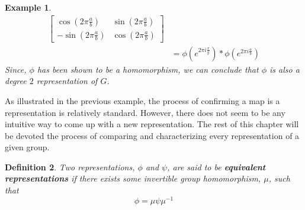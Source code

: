 \documentclass[10pt]{ucthesis}
\newtheorem{definition}{Definition}[chapter]
\newtheorem{example}[definition]{Example}
\begin{document}
\begin{example}
\begin{equation}
\begin{aligned}
											  		  \begin{bmatrix}
														\cos(2\pi\frac{a}{b}) & \sin(2\pi\frac{a}{b}) \\
														-\sin(2\pi\frac{a}{b}) & \cos(2\pi\frac{a}{b})
													  \end{bmatrix} \\
		                                                                                    &= \phi(e^{2\pi i\frac{x}{y}})*\phi(e^{2\pi i\frac{a}{b}})
		\end{aligned}
	\end{equation}
	Since, $\phi$ has been shown to be a homomorphism, we can conclude that $\phi$ is also a degree $2$ representation of $G$.
\end{example}

As illustrated in the previous example, the process of confirming a map is a representation is relatively standard. However, there does not seem to be any intuitive way to come up with a new representation. The rest of this chapter will be devoted the process of comparing and characterizing every representation of a given group.


\begin{definition}
	Two representations, $\phi$ and $\psi$, are said to be \textbf{equivalent representations} if there exists some invertible group homomorphism, $\mu$, such that $$\phi = \mu \psi \mu^{-1}$$
\end{definition}









\clearpage

%
%
\end{document}

